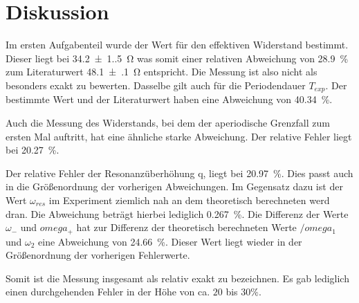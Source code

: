 \section{Diskussion}
\label{sec:Diskussion}

Im ersten Aufgabenteil wurde der Wert für den effektiven Widerstand bestimmt. Dieser liegt bei \SI{34.2(1.5)}{\ohm} was somit einer relativen Abweichung von \SI{28.9}{\percent} zum Literaturwert \SI{48.1(1)}{\ohm} entspricht. Die Messung ist also nicht als besonders exakt zu bewerten. Dasselbe gilt auch für die Periodendauer $T_{exp}$. Der bestimmte Wert und der Literaturwert haben eine Abweichung von \SI{40.34}{\percent}.

Auch die Messung des Widerstands, bei dem der aperiodische Grenzfall zum ersten Mal auftritt, hat eine ähnliche starke Abweichung. Der relative Fehler liegt bei \SI{20.27}{\percent}.

Der relative Fehler der Resonanzüberhöhung q, liegt bei \SI{20.97}{\percent}. Dies passt auch in die Größenordnung der vorherigen Abweichungen. Im Gegensatz dazu ist der Wert $\omega_{res}$ im Experiment ziemlich nah an dem theoretisch berechneten werd dran. Die Abweichung beträgt hierbei lediglich \SI{0.267}{\percent}. Die Differenz der Werte $\omega_{-}$ und $omega_{+}$ hat zur Differenz der theoretisch berechneten Werte $/omega_{1}$ und $\omega_{2}$ eine Abweichung von \SI{24.66}{\percent}. Dieser Wert liegt wieder in der Größenordnung der vorherigen Fehlerwerte. 

Somit ist die Messung insgesamt als relativ exakt zu bezeichnen. Es gab lediglich einen durchgehenden Fehler in der Höhe von ca. $20$ bis $30 \si{\percent}$.  
